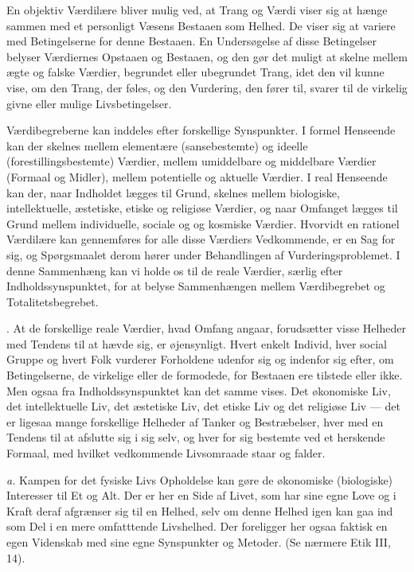 \documentclass[12pt]{article}
\newcommand{\opage}[1]{\marginnote{\footnotesize\textit{[#1]}}}
\begin{document}
\opage{68}En objektiv Værdilære bliver mulig ved, at Trang og Værdi viser sig at
hænge sammen med et personligt Væsens Bestaaen som Helhed. De viser sig at
variere med Betingelserne for denne Bestaaen. En Undersøgelse af disse
Betingelser belyser Værdiernes Opstaaen og Bestaaen, og den gør det muligt at
skelne mellem ægte og falske Værdier, begrundet eller ubegrundet Trang, idet den
vil kunne vise, om den Trang, der føles, og den Vurdering, den fører til, svarer
til de virkelig givne eller mulige Livsbetingelser.

Værdibegreberne kan inddeles efter forskellige Synspunkter. I formel Henseende
kan der skelnes mellem elementære (sansebestemte) og ideelle
(forestillingsbestemte) Værdier, mellem umiddelbare og middelbare Værdier
(Formaal og Midler), mellem potentielle og aktuelle Værdier. I real Henseende
kan der, naar Indholdet lægges til Grund, skelnes mellem biologiske,
intellektuelle, æstetiske, etiske og religiøse Værdier, og naar Omfanget lægges
til Grund mellem individuelle, sociale og
og kosmiske Værdier. Hvorvidt en rationel Værdilære kan gennemføres for alle
disse Værdiers Vedkommende, er en Sag for sig, og Spørgsmaalet derom hører under
Behandlingen af Vurderingsproblemet. I denne Sammenhæng kan vi holde os til de
reale Værdier, særlig efter Indholdssynspunktet, for at belyse Sammenhængen
mellem Værdibegrebet og Totalitetsbegrebet.

. At de forskellige reale Værdier, hvad Omfang angaar, forudsætter visse
Helheder med Tendens til at hævde sig, er øjensynligt. Hvert enkelt Individ,
hver social Gruppe og hvert Folk vurderer Forholdene udenfor sig og indenfor sig
efter, om Betingelserne, de virkelige eller de formodede, for Bestaaen ere
tilstede eller ikke. Men ogsaa fra Indholdssynspunktet kan det samme vises. Det
økonomiske Liv, det intellektuelle Liv, det æstetiske Liv, det etiske Liv og det
religiøse Liv --- det er ligesaa mange forskellige Helheder af Tanker og
Bestræbelser, hver med en Tendens til at afslutte sig i sig selv, og hver for
sig bestemte ved et herskende Formaal, med hvilket vedkommende Livsomraade staar
og falder.

\textit{a.} Kampen for det fysiske Livs Opholdelse kan gøre de økonomiske
(biologiske) Interesser til Et og Alt. Der er her en Side af Livet, som har sine
egne Love og i Kraft deraf afgrænser sig til en Helhed, selv om denne Helhed
igen kan gaa ind som Del i en mere omfatttende Livshelhed. Der foreligger her
ogsaa faktisk en egen Videnskab med sine egne Synspunkter og Metoder. (Se
nærmere Etik III, 14).
\end{document}
